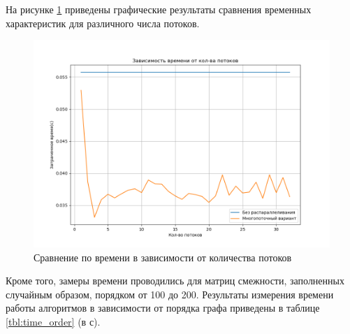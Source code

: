 На рисунке \ref{img:count_threads} приведены графические результаты сравнения временных характеристик для различного числа потоков.

\begin{figure}[H]
	\begin{center}
		\includegraphics[scale=0.5]{img/count_threads.png}
	\end{center}
	\captionsetup{justification=centering}
	\caption{Сравнение по времени в зависимости от количества потоков}
	\label{img:count_threads}
\end{figure}

Кроме того, замеры времени проводились для матриц смежности, заполненных случайным образом, порядком от 100 до 200. Результаты измерения времени работы алгоритмов в зависимости от порядка графа приведены в таблице \ref{tbl:time_order} (в с).

